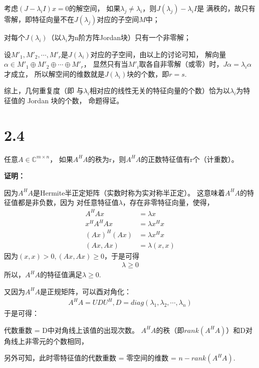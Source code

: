 \documentclass{article}
\begin{document}
考虑$(J - \lambda_i I) x = 0$的解空间，
如果$\lambda_j \neq \lambda_i$，则$J(\lambda_j) - \lambda_i I$是
满秩的，故只有零解，即特征向量不在$J(\lambda_j)$对应的子空间$M$中；

对每个$J(\lambda_i)$（以$\lambda_i$为n阶方阵Jordan块）只有一个非零解；

设$M'_1, M'_2, \cdots, M'_r$是$J(\lambda_i)$对应的子空间，由以上的讨论可知，
解向量$\alpha \in M'_1 \oplus M'_2 \oplus \cdots \oplus M'_r$，
显然只有当$M'_i$取各自非零解（或零）时，$J \alpha = \lambda_i \alpha$才成立，
所以解空间的维数就是$J(\lambda_i)$块的个数，即$r = s$.

综上，几何重复度（即
与$\lambda_i$相对应的线性无关的特征向量的个数）恰为以$\lambda_i$为特征值的 Jordan 块的个数，
命题得证。

\section*{2.4}

\begin{zremark}
  任意$A \in \mathbb{C}^{m \times n}$，
  如果$A^H A$的秩为r，则$A^H A$的正数特征值有r个（计重数）。
\end{zremark}

\textbf{证明：}

因为$A^H A$是Hermite半正定矩阵（实数时称为实对称半正定）。
这意味着$A^H A$的特征值都是非负数，因为
对任意特征值$\lambda$，存在非零特征向量，使得，
\begin{align*}
  A^H A x     & = \lambda x      \\
  x^H A^H A x & = \lambda x^H x  \\
  (Ax)^H (Ax) & = \lambda x^H x  \\
  (Ax, Ax)    & = \lambda (x, x)
\end{align*}
因为$(x, x) > 0, (Ax, Ax) \geq 0$，于是可得
\begin{align*}
  \lambda \geq 0
\end{align*}
所以，$A^H A$的特征值满足$\lambda \geq 0$.

又因为$A^H A$是正规矩阵，可以酉对角化：
\begin{align*}
  A^H A = U D U^H, D = diag(\lambda_1, \lambda_2, \cdots, \lambda_n)
\end{align*}
于是可得：

代数重数 = D中对角线上该值的出现次数。
$A^H A$的秩（即$rank(A^H A)$）和D对角线上非零元的个数相同，

另外可知，此时零特征值的代数重数 = 零空间的维数 = $n - rank(A^H A)$.
\end{document}

